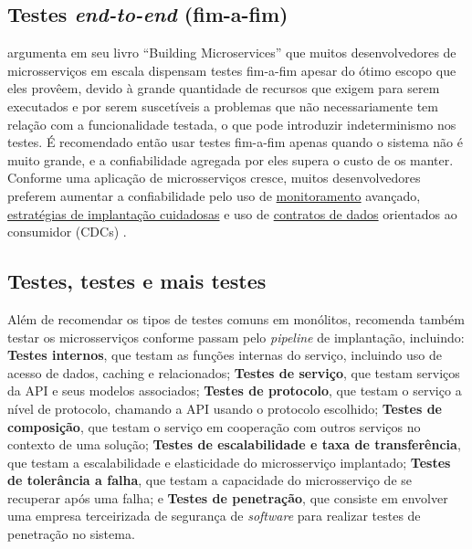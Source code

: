 \subsection{Testes \emph{end-to-end} (fim-a-fim)}\label{subsecao-testes-fimafim}
 argumenta em seu livro “Building Microservices” que muitos desenvolvedores de microsserviços em escala dispensam testes fim-a-fim apesar do ótimo escopo que eles provêem, devido à grande quantidade de recursos que exigem para serem executados e por serem suscetíveis a problemas que não necessariamente tem relação com a funcionalidade testada, o que pode introduzir indeterminismo nos testes. É recomendado então usar testes fim-a-fim apenas quando o sistema não é muito grande, e a confiabilidade agregada por eles supera o custo de os manter. Conforme uma aplicação de microsserviços cresce, muitos desenvolvedores preferem aumentar a confiabilidade pelo uso de \hyperref[observabilidade-monitoramento]{monitoramento} avançado, \hyperref[estrategias-implantacao]{estratégias de implantação cuidadosas} e uso de \hyperref[subsecao-contratos-de-dados]{contratos de dados} orientados ao consumidor (CDCs) 
\cite{livro-building-microservices}.


\subsection{Testes, testes e mais testes}
Além de recomendar os tipos de testes comuns em monólitos,  recomenda também testar os microsserviços conforme passam pelo \emph{pipeline} de implantação, incluindo: \textbf{Testes internos}, que testam as funções internas do serviço, incluindo uso de acesso de dados, caching e relacionados; \textbf{Testes de serviço}, que testam serviços da API e seus modelos associados; \textbf{Testes de protocolo}, que testam o serviço a nível de protocolo, chamando a API usando o protocolo escolhido; \textbf{Testes de composição}, que testam o serviço em cooperação com outros serviços no contexto de uma solução; \textbf{Testes de escalabilidade e taxa de transferência}, que testam a escalabilidade e elasticidade do microsserviço implantado; \textbf{Testes de tolerância a falha}, que testam a capacidade do microsserviço de se recuperar após uma falha; e \textbf{Testes de penetração}, que consiste em envolver uma empresa terceirizada de segurança de \emph{software} para realizar testes de penetração no sistema. \cite{Familiar2015}

